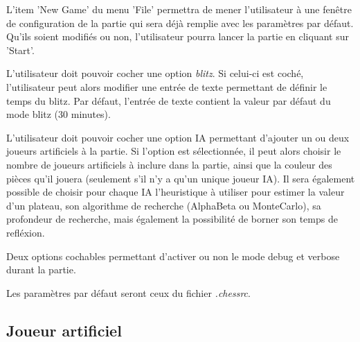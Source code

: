 \documentclass{article}
\begin{document}
\begin{needbox}
    L’item ’New Game’ du menu ’File’ permettra de mener l’utilisateur à une fenêtre de configuration
    de la partie qui sera déjà remplie avec les paramètres par défaut. Qu’ils soient modifiés ou
    non, l’utilisateur pourra lancer la partie en cliquant sur ’Start’.
    \begin{subneedbox}
        L'utilisateur doit pouvoir cocher une option \textit{blitz}.
        Si celui-ci est coché, l'utilisateur peut alors modifier une entrée
        de texte permettant de définir le temps du blitz. Par défaut, l'entrée de texte
        contient la valeur par défaut du mode blitz (30 minutes).
    \end{subneedbox}
    \begin{subneedbox}
        L'utilisateur doit pouvoir cocher une option IA permettant d'ajouter
        un ou deux joueurs artificiels à la partie. Si l'option est sélectionnée,
        il peut alors choisir le nombre de joueurs artificiels à inclure dans la partie,
        ainsi que la couleur des pièces qu'il jouera (seulement s'il n'y a qu'un unique
        joueur IA).
        Il sera également possible de choisir pour chaque IA l'heuristique à utiliser pour
        estimer la valeur d'un plateau, son algorithme de recherche (AlphaBeta ou MonteCarlo),
        sa profondeur de recherche, mais également la possibilité de borner son temps de refléxion.
    \end{subneedbox}
    \begin{subneedbox}
        Deux options cochables permettant d'activer ou non le mode debug et verbose
        durant la partie.
    \end{subneedbox}
    \begin{subneedbox}
        Les paramètres par défaut seront ceux du fichier \textit{.chessrc}.
    \end{subneedbox}
\end{needbox}

\subsection{Joueur artificiel}

\begin{needbox}
    
\end{needbox}
\end{document}
